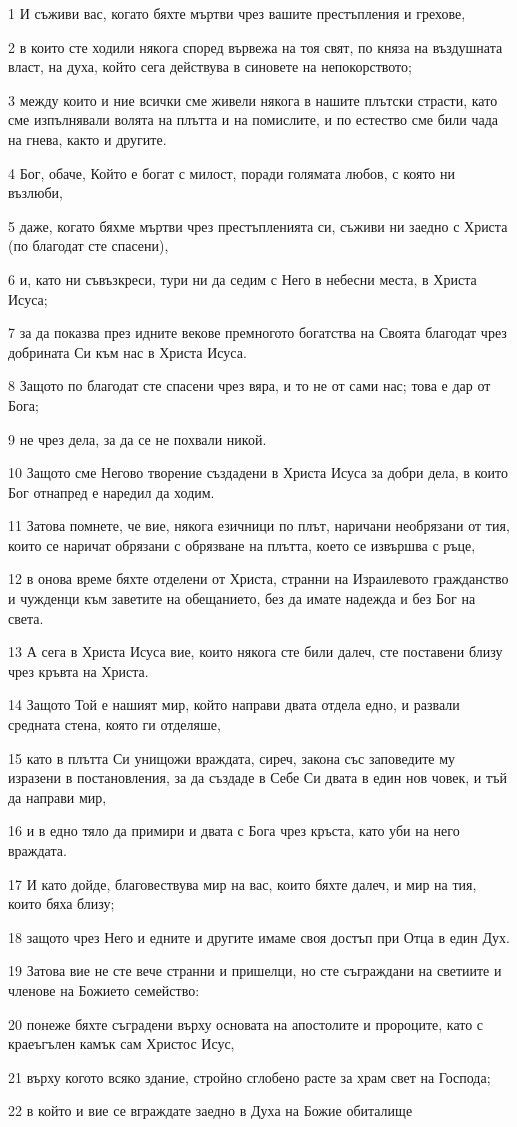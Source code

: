 \par 1 И съживи вас, когато бяхте мъртви чрез вашите престъпления и грехове,
\par 2 в които сте ходили някога според вървежа на тоя свят, по княза на въздушната власт, на духа, който сега действува в синовете на непокорството;
\par 3 между които и ние всички сме живели някога в нашите плътски страсти, като сме изпълнявали волята на плътта и на помислите, и по естество сме били чада на гнева, както и другите.
\par 4 Бог, обаче, Който е богат с милост, поради голямата любов, с която ни възлюби,
\par 5 даже, когато бяхме мъртви чрез престъпленията си, съживи ни заедно с Христа (по благодат сте спасени),
\par 6 и, като ни съвъзкреси, тури ни да седим с Него в небесни места, в Христа Исуса;
\par 7 за да показва през идните векове премногото богатства на Своята благодат чрез добрината Си към нас в Христа Исуса.
\par 8 Защото по благодат сте спасени чрез вяра, и то не от сами нас; това е дар от Бога;
\par 9 не чрез дела, за да се не похвали никой.
\par 10 Защото сме Негово творение създадени в Христа Исуса за добри дела, в които Бог отнапред е наредил да ходим.
\par 11 Затова помнете, че вие, някога езичници по плът, наричани необрязани от тия, които се наричат обрязани с обрязване на плътта, което се извършва с ръце,
\par 12 в онова време бяхте отделени от Христа, странни на Израилевото гражданство и чужденци към заветите на обещанието, без да имате надежда и без Бог на света.
\par 13 А сега в Христа Исуса вие, които някога сте били далеч, сте поставени близу чрез кръвта на Христа.
\par 14 Защото Той е нашият мир, който направи двата отдела едно, и развали средната стена, която ги отделяше,
\par 15 като в плътта Си унищожи враждата, сиреч, закона със заповедите му изразени в постановления, за да създаде в Себе Си двата в един нов човек, и тъй да направи мир,
\par 16 и в едно тяло да примири и двата с Бога чрез кръста, като уби на него враждата.
\par 17 И като дойде, благовествува мир на вас, които бяхте далеч, и мир на тия, които бяха близу;
\par 18 защото чрез Него и едните и другите имаме своя достъп при Отца в един Дух.
\par 19 Затова вие не сте вече странни и пришелци, но сте съграждани на светиите и членове на Божието семейство:
\par 20 понеже бяхте съградени върху основата на апостолите и пророците, като с краеъгълен камък сам Христос Исус,
\par 21 върху когото всяко здание, стройно сглобено расте за храм свет на Господа;
\par 22 в който и вие се вграждате заедно в Духа на Божие обиталище

